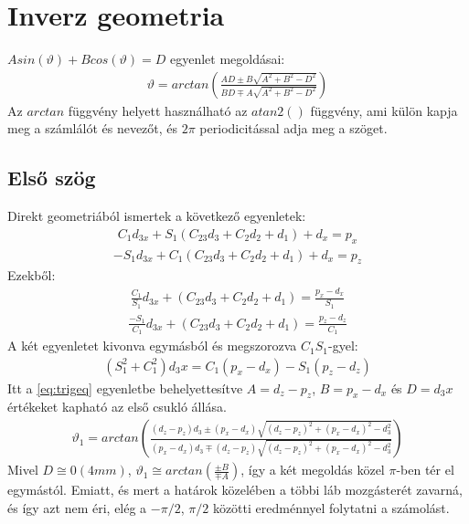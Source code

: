 \documentclass{article}
\begin{document}
\section{Inverz geometria}
$A sin(\vartheta)+B cos(\vartheta)=D$ egyenlet megoldásai:
\begin{align} \label{eq:trigeq}
\vartheta = arctan \left( \frac{A D\pm B\sqrt{A^2+B^2-D^2}}{B D\mp A\sqrt{A^2+B^2-D^2}} \right)
\end{align}
Az $arctan$ függvény helyett használható az $atan2()$ függvény, ami külön kapja meg a számlálót és nevezőt, és $2\pi$ periodicitással adja meg a szöget.
\subsection{Első szög}
Direkt geometriából ismertek a következő egyenletek:
\begin{align*}
C_1 d_{3x}+S_1 (C_{23} d_3+C_2 d_2+d_1)+d_x=p_x
\end{align*}
\begin{align*}
-S_1 d_{3x}+C_1 (C_{23} d_3+C_2 d_2+d_1)+d_x=p_z
\end{align*}
Ezekből:
\begin{align*}
\frac{C_1}{S_1}d_{3x}+(C_{23} d_3+C_2 d_2+d_1)=\frac{p_x-d_x}{S_1}
\end{align*}
\begin{align*}
\frac{-S_1}{C_1}d_{3x}+(C_{23} d_3+C_2 d_2+d_1)=\frac{p_z-d_z}{C_1}
\end{align*}
A két egyenletet kivonva egymásból és megszorozva $C_1 S_1$-gyel:
\begin{align*}
(S_1^2+C_1^2 ) d_3x=C_1 (p_x-d_x )-S_1 (p_z-d_z)
\end{align*}
Itt a \eqref{eq:trigeq} egyenletbe behelyettesítve $A=d_z-p_z$, $B=p_x-d_x$ és $D=d_3x$ értékeket kapható az első csukló állása.
\begin{align}
\vartheta_1 = arctan \left( \frac{(d_z-p_z) d_3\pm (p_x-d_x)\sqrt{(d_z-p_z)^2+(p_x-d_x)^2-d_3^2}}{(p_x-d_x) d_3\mp (d_z-p_z)\sqrt{(d_z-p_z)^2+(p_x-d_x)^2-d_3^2}} \right)
\end{align}
 Mivel $D\cong0 (4 mm)$, $\vartheta_1\cong arctan\left(\frac{\pm B}{\mp A}\right)$, így a két megoldás közel $\pi$-ben tér el egymástól. Emiatt, és mert a határok közelében a többi láb mozgásterét zavarná, és így azt nem éri, elég a $-\pi/2$, $\pi/2$ közötti eredménnyel folytatni a számolást.
\end{document}
